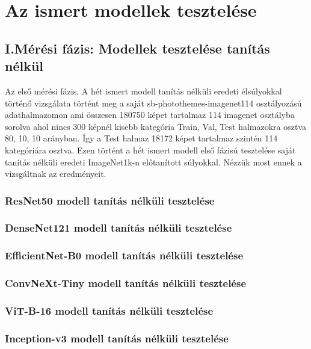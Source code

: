 \documentclass[	
  noindent
]{elteikthesis}[2024/04/26]
\begin{document}
\chapter{Az ismert modellek tesztelése}
  \section{I.Mérési fázis: Modellek tesztelése tanítás nélkül}
    Az első mérési fázis. A hét ismert modell tanítás nélküli eredeti élsúlyokkal történő vizsgálata történt meg a saját sb-photothemes-imagenet114 osztályozású adathalmazomon ami összesen 180750 képet tartalmaz 114 imagenet osztályba sorolva ahol nincs 300 képnél kisebb kategória Train, Val, Test halmazokra osztva 80, 10, 10 arányban. Így a Test halmaz 18172 képet tartalmaz szintén 114 kategóriára osztva. Ezen történt a hét ismert modell első fázisú tesztelése saját tanítás nélküli eredeti ImageNet1k-n előtanított súlyokkal. Nézzük most ennek a vizsgáltnak az eredményeit.

    \subsection{ResNet50 modell tanítás nélküli tesztelése}
      
    \subsection{DenseNet121 modell tanítás nélküli tesztelése}
      
    \subsection{EfficientNet-B0 modell tanítás nélküli tesztelése}
      
    \subsection{ConvNeXt-Tiny modell tanítás nélküli tesztelése}
      
    \subsection{ViT-B-16 modell tanítás nélküli tesztelése}
      
    \subsection{Inception-v3 modell tanítás nélküli tesztelése}
      
\end{document}
